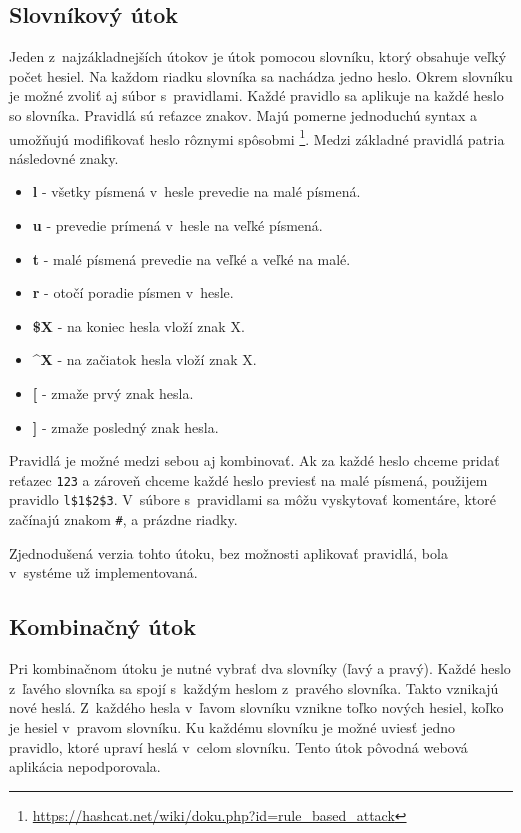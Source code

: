 \documentclass[slovak]{fitthesis}
\begin{document}
\subsection{Slovníkový útok} \label{dictAttack}
Jeden z~najzákladnejších útokov je útok pomocou slovníku, ktorý obsahuje veľký počet hesiel. Na každom riadku slovníka sa nachádza jedno heslo. Okrem slovníku je možné zvoliť aj súbor s~pravidlami. Každé pravidlo sa aplikuje na každé heslo so slovníka. Pravidlá sú reťazce znakov. Majú pomerne jednoduchú syntax a umožňujú modifikovať heslo rôznymi spôsobmi \footnote{\url{https://hashcat.net/wiki/doku.php?id=rule_based_attack}}. Medzi základné pravidlá patria následovné znaky.
\begin{itemize}
    \item \textbf{l} - všetky písmená v~hesle prevedie na malé písmená.
    \item \textbf{u} - prevedie prímená v~hesle na veľké písmená.
    \item \textbf{t} - malé písmená prevedie na veľké a veľké na malé.
    \item \textbf{r} - otočí poradie písmen v~hesle.
    \item \textbf{\$X} - na koniec hesla vloží znak X.
    \item \textbf{\^{}X} - na začiatok hesla vloží znak X. 
    \item \textbf{[} - zmaže prvý znak hesla.
    \item \textbf{]} - zmaže posledný znak hesla.
\end{itemize}
Pravidlá je možné medzi sebou aj kombinovať. Ak za každé heslo chceme pridať reťazec \texttt{123} a zároveň chceme každé heslo previesť na malé písmená, použijem pravidlo \texttt{l\$1\$2\$3}. V~súbore s~pravidlami sa môžu vyskytovať komentáre, ktoré začínajú znakom \texttt{\#}, a prázdne riadky.

Zjednodušená verzia tohto útoku, bez možnosti aplikovať pravidlá, bola v~systéme už implementovaná.

\subsection{Kombinačný útok} \label{combAttack}
Pri kombinačnom útoku je nutné vybrať dva slovníky (ľavý a pravý). Každé heslo z~ľavého slovníka sa spojí s~každým heslom z~pravého slovníka. Takto vznikajú nové heslá. Z~každého hesla v~ľavom slovníku vznikne toľko nových hesiel, koľko je hesiel v~pravom slovníku. Ku každému slovníku je možné uviesť jedno pravidlo, ktoré upraví heslá v~celom slovníku. Tento útok pôvodná webová aplikácia nepodporovala.
\end{document}

